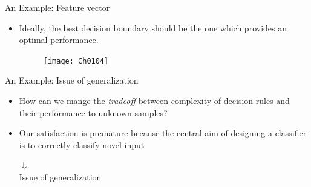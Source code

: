 \begin{frame}{An Example: Feature vector}
\begin{itemize}
\item Ideally, the best decision boundary should be the one which provides an optimal performance.
\begin{figure}
\texttt{[image: Ch0104]}
\end{figure}
\end{itemize}
\end{frame}

\begin{frame}{An Example: Issue of generalization}
\begin{itemize}
\item How can we mange the \textit{\color{mycolor2}tradeoff} between complexity of decision rules and their performance to unknown samples?
\item Our satisfaction is premature because the central aim of designing a classifier is to correctly classify novel input\\
\vspace{14pt}
\begin{center}
{\Huge $\Downarrow$}\\
\vspace{14pt}
Issue of generalization
\end{center}
\end{itemize}
\end{frame}

